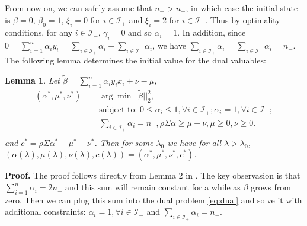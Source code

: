 \documentclass[10pt]{article}
\newtheorem{lamma}{Lemma}[section]
\theoremstyle{definition}
\begin{document}
From now on, we can safely assume that $n_+>n_-$, in which case the initial state is $\beta = 0$, $\beta_0=1$, $\xi_i = 0$ for $i\in \mathcal I_+$ and $\xi_i = 2$ for $i\in \mathcal I_-$. Thus by optimality conditions, for any $i\in \mathcal I_-$, $\gamma_i =0$ and so $\alpha_i=1$. In addition, since $0=\sum_{i=1}^n \alpha_i y_i = \sum_{i\in \mathcal I_+} \alpha_i - \sum_{i\in \mathcal I_-} \alpha_i$, we have $\sum_{i\in \mathcal I_+} \alpha_i = \sum_{i\in \mathcal I_-} \alpha_i = n_-$. The following lemma determines the initial value for the dual valuables:
\begin{lamma} Let $\tilde{\beta} = \sum_{i=1}^n \alpha_i y_i x_i + \nu - \mu$, 
\[
\begin{array}{rl}
(\alpha^*,\mu^*,\nu^*) = & \arg\min ||\tilde{\beta}||_2^2, \\
& \text{subject to: } 0\leq \alpha_i\leq 1,  \forall i \in \mathcal I_+; \alpha_i = 1,  \forall i \in \mathcal I_-; \\
& \sum_{i \in \mathcal I_+}\alpha_i = n_-, \rho\Sigma\alpha \geq \mu+\nu, \mu\geq0, \nu\geq0. \\
\end{array}
\]
 and $c^* = \rho\Sigma\alpha^* - \mu^*-\nu^*$. Then for some $\lambda_0$ we have for all $\lambda>\lambda_0$, $(\alpha(\lambda),\mu(\lambda),\nu(\lambda),c(\lambda)) = (\alpha^*, \mu^*,\nu^*,c^*)$.
\end{lamma}  
\noindent\textbf{Proof.} The proof follows directly from Lemma 2 in \cite{hastie2004entire}. The key observasion is that  $\sum_{i=1}^n \alpha_i = 2n_-$ and this sum will remain constant for a while as $\beta$ grows from zero. Then we can plug this sum into the dual problem \eqref{eq:dual} and solve it with additional constraints: $\alpha_i = 1,  \forall i \in \mathcal I_-$ and $\sum_{i \in \mathcal I_+}\alpha_i = n_-$. \\ 
\end{document}
